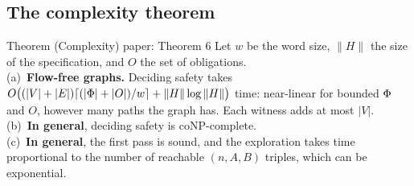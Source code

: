 \subsection{The complexity theorem}

\begin{statement}{Theorem (Complexity) \hfill\normalfont paper: Theorem 6}
Let $w$ be the word size, $\|H\|$ the size of the specification, and $O$ the set of obligations.\\
(a)~\textbf{Flow-free graphs.} Deciding safety takes $O\bigl((|V|+|E|)\lceil(|\Phi|+|O|)/w\rceil+\|H\|\log\|H\|\bigr)$ time: near-linear for bounded $\Phi$ and $O$, however many paths the graph has. Each witness adds at most $|V|$.\\
(b)~\textbf{In general}, deciding safety is coNP-complete.\\
(c)~\textbf{In general}, the first pass is sound, and the exploration takes time proportional to the number of reachable $(n,A,B)$ triples, which can be exponential.
\end{statement}

